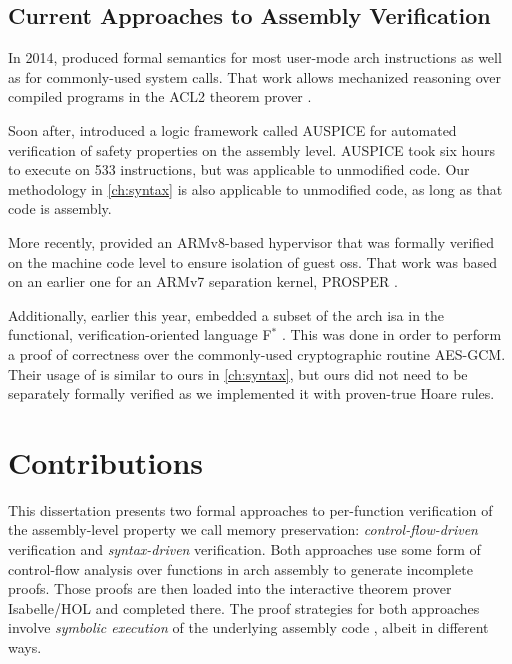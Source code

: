 \subsection{Current Approaches to Assembly Verification}
In 2014, \textcite{goel2014syscalls,goelphd} produced formal semantics
for most user-mode \gls{arch} instructions as well as for commonly-used system calls.
That work allows mechanized reasoning over compiled programs
in the ACL2 theorem prover \autocite{ACL2}.

Soon after, \textcite{tan2015auspice} introduced a logic framework called AUSPICE
for automated verification of safety properties on the assembly level.
AUSPICE took six hours to execute on \num{533} instructions, but was applicable to unmodified code.
Our methodology in \cref{ch:syntax} is also applicable to unmodified code,
as long as that code is assembly.

More recently, \textcite{baumann2016high} provided an ARMv8-based hypervisor
that was formally verified on the machine code level
to ensure isolation of guest \acp{os}.
That work was based on an earlier one for an ARMv7 separation kernel,
PROSPER \autocite{dam2013hypervisor,dam2013formal}.

Additionally, earlier this year, \textcite{fromherz2019verified} embedded a subset
of the \gls{arch} \ac{isa} in the functional, verification-oriented language
F$^*$ \autocite{fstar}.
This was done in order to perform a proof of correctness
over the commonly-used cryptographic routine AES-GCM.
Their usage of  is similar to ours in \cref{ch:syntax},
but ours did not need to be separately formally verified as we implemented
it with proven-true Hoare rules.

\section{Contributions}
This dissertation presents two formal approaches to per-function verification
of the assembly-level property we call memory preservation:
\emph{control-flow-driven} verification and \emph{syntax-driven} verification.
Both approaches use some form of control-flow analysis over functions in \gls{arch} assembly
to generate incomplete proofs.
Those proofs are then loaded into the interactive theorem prover Isabelle/HOL
and completed there. The proof strategies for both approaches involve
\emph{symbolic execution} of the underlying assembly code \autocite{king1976symbolic},
albeit in different ways.

